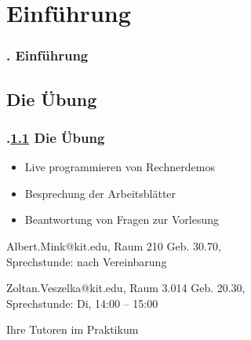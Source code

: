 \section{Einführung}
\begin{frame}
  \frametitle{\kap. Einführung}%
\tableofcontents[current]
\end{frame}


\def\stitle{Die Übung}%
\subsection{\stitle}\label{S:Uebersicht}
\begin{frame}[fragile]%
  \frametitle{\kap.\ref{S:Uebersicht} \stitle}%

\begin{itemize}
  \item Live programmieren von Rechnerdemos
  \item Besprechung der Arbeitsblätter
  \item Beantwortung von Fragen zur Vorlesung
\end{itemize}
\hfill

\begin{description}[leftmargin=*,style=nextline]
  \item[\textcolor{black}{\textbf{Ansprechpartner}}]
  \item[Übung] Albert.Mink@kit.edu, Raum 210 Geb. 30.70,\\ Sprechstunde: nach Vereinbarung
  \item[Übung und Praktikum] Zoltan.Veszelka@kit.edu, Raum 3.014 Geb. 20.30,\\ Sprechstunde: Di, 14:00 -- 15:00
  \item[Praktikum] Ihre Tutoren im Praktikum
\end{description}
\end{frame}


\def\stitle{Bearbeitung der Praktikumsaufgaben}%
